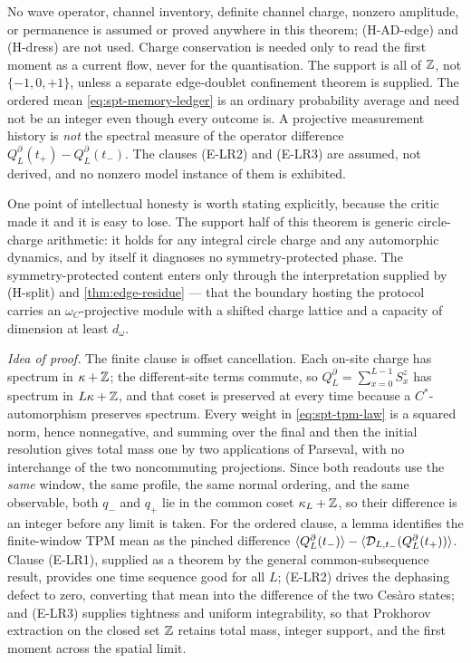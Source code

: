 \begin{scope}
No wave operator, channel inventory, definite channel charge, nonzero
amplitude, or permanence is assumed or proved anywhere in this theorem;
(H-AD-edge) and (H-dress) are not used. Charge conservation is needed only to
read the first moment as a current flow, never for the quantisation. The
support is all of $\mathbb{Z}$, not $\{-1,0,+1\}$, unless a separate edge-doublet
confinement theorem is supplied. The ordered mean
\eqref{eq:spt-memory-ledger} is an ordinary probability average and need not
be an integer even though every outcome is. A projective measurement history
is \emph{not} the spectral measure of the operator difference
$Q^{\partial}_L(t_+)-Q^{\partial}_L(t_-)$. The clauses (E-LR2) and (E-LR3) are
assumed, not derived, and no nonzero model instance of them is exhibited.

One point of intellectual honesty is worth stating explicitly, because the
critic made it and it is easy to lose. The support half of this theorem is
generic circle-charge arithmetic: it holds for any integral circle charge and
any automorphic dynamics, and by itself it diagnoses no
symmetry-protected phase. The symmetry-protected content enters only through
the interpretation supplied by (H-split) and \cref{thm:edge-residue} --- that
the boundary hosting the protocol carries an $\omega_C$-projective module with
a shifted charge lattice and a capacity of dimension at least $d_\omega$.
\end{scope}

\emph{Idea of proof.} The finite clause is offset cancellation. Each on-site
charge has spectrum in $\kappa+\mathbb{Z}$; the different-site terms commute, so
$Q^{\partial}_L=\sum_{x=0}^{L-1}S^{z}_x$ has spectrum in $L\kappa+\mathbb{Z}$, and
that coset is preserved at every time because a $C^{*}$-automorphism preserves
spectrum. Every weight in \eqref{eq:spt-tpm-law} is a squared norm, hence
nonnegative, and summing over the final and then the initial resolution gives
total mass one by two applications of Parseval, with no interchange of the two
noncommuting projections. Since both readouts use the \emph{same} window, the
same profile, the same normal ordering, and the same observable, both $q_-$
and $q_+$ lie in the common coset $\kappa_L+\mathbb{Z}$, so their difference is an
integer before any limit is taken. For the ordered clause, a lemma identifies
the finite-window TPM mean as the pinched difference
$\langle Q^{\partial}_L(t_-)\rangle-\langle \mathcal{D}_{L,t_-}(Q^{\partial}_L(t_+))\rangle$.
Clause (E-LR1), supplied as a theorem by the general common-subsequence
result, provides one time sequence good for all $L$; (E-LR2) drives the
dephasing defect to zero, converting that mean into the difference of the two
Ces\`aro states; and (E-LR3) supplies tightness and uniform integrability, so
that Prokhorov extraction on the closed set $\mathbb{Z}$ retains total mass, integer
support, and the first moment across the spatial limit.

